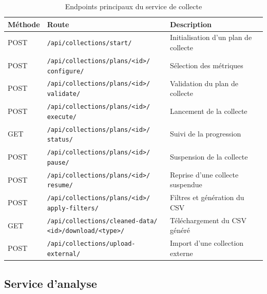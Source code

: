 \begin{table}[H]
\centering
\small
\caption{Endpoints principaux du service de collecte}
\label{tab:endpoints-collection}
\begin{tabular}{|>{\centering\arraybackslash}p{1.5cm}
                |>{\raggedright\arraybackslash}p{7.2cm}
                |>{\raggedright\arraybackslash}p{3.8cm}|}
\hline
\textbf{Méthode} & \textbf{Route} & \textbf{Description} \\
\hline
POST & \texttt{/api/collections/start/} & Initialisation d'un plan de collecte \\
\hline
POST & \makecell[l]{\texttt{/api/collections/plans/<id>/} \\ \texttt{configure/}} & Sélection des métriques \\
\hline
POST & \makecell[l]{\texttt{/api/collections/plans/<id>/} \\ \texttt{validate/}} & Validation du plan de collecte \\
\hline
POST & \makecell[l]{\texttt{/api/collections/plans/<id>/} \\ \texttt{execute/}} & Lancement de la collecte \\
\hline
GET & \makecell[l]{\texttt{/api/collections/plans/<id>/} \\ \texttt{status/}} & Suivi de la progression \\
\hline
POST & \makecell[l]{\texttt{/api/collections/plans/<id>/} \\ \texttt{pause/}} & Suspension de la collecte \\
\hline
POST & \makecell[l]{\texttt{/api/collections/plans/<id>/} \\ \texttt{resume/}} & Reprise d'une collecte suspendue \\
\hline
POST & \makecell[l]{\texttt{/api/collections/plans/<id>/} \\ \texttt{apply-filters/}} & Filtres et génération du CSV \\
\hline
GET & \makecell[l]{\texttt{/api/collections/cleaned-data/} \\ \texttt{<id>/download/<type>/}} & Téléchargement du CSV généré \\
\hline
POST & \texttt{/api/collections/upload-external/} & Import d'une collection externe \\
\hline
\end{tabular}
\end{table}

\subsection{Service d'analyse}

